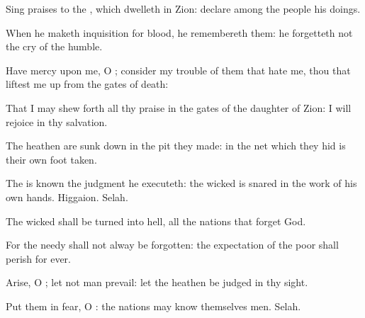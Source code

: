 {\Q {}Sing
praises to the
{}, which
dwelleth in
Zion:
declare among the
people his
doings.


\par }{\Q {}When he maketh
inquisition for
blood, he
remembereth them: he
forgetteth not the
cry of the
humble.


\par }{\Q {}Have
mercy upon me, O
{};
consider my
trouble
{} of them that
hate me, thou that liftest me
up from the
gates of
death:


\par }{\Q {}That I may shew
forth all thy
praise in the
gates of the
daughter of
Zion: I will
rejoice in thy
salvation.


\par }{\Q {}The
heathen are sunk
down in the
pit
{} they
made: in the
net
which they
hid is their own
foot
taken.


\par }{\Q {}The
{} is
known
{} the
judgment
{} he
executeth: the
wicked is
snared in the
work of his own
hands.
Higgaion.
Selah.


\par }{\Q {}The
wicked shall be
turned into
hell,
{} all the
nations that
forget
God.


\par }{\Q {}For the
needy shall not
alway be
forgotten: the
expectation of the
poor shall
{}
perish for
ever.


\par }{\Q {}Arise, O
{}; let not
man
prevail: let the
heathen be
judged in thy
sight.


\par }{\Q {}Put them in
fear, O
{}:
{} the
nations may
know themselves
{}
men.
Selah.




\par }
